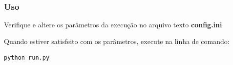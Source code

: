 \documentclass[paper=a4, fontsize=11pt]{scrartcl}
\numberwithin{equation}{section}		%
\numberwithin{figure}{section}			%
\numberwithin{table}{section}				%
\begin{document}
\subsubsection{Uso}
Verifique e altere os parâmetros da execução no arquivo texto \textbf{config.ini}\label{config.ini}

Quando estiver satisfeito com os parâmetros, execute na linha de comando:
\begin{lstlisting}[language=bash, frame=leftline,basicstyle=\footnotesize\ttfamily] 
python run.py
\end{lstlisting}



\end{document}
